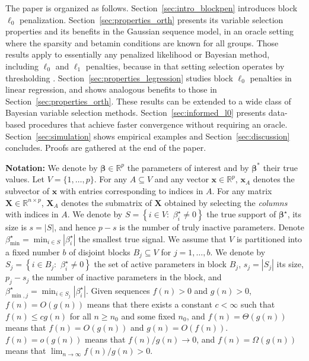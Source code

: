 \documentclass[aos]{imsart}
\theoremstyle{plain}
\newcommand{\R}{\mathbb{R}}
\newcommand{\bs}{\boldsymbol}
\begin{document}
The paper is organized as follows. Section~\ref{sec:intro_blockpen} introduces block $\ell_0$ penalization. Section~\ref{sec:properties_orth} presents its
variable selection properties and its benefits in the Gaussian sequence model, in an oracle setting where the sparsity and betamin conditions are known for all groups.
Those results apply to essentially any penalized likelihood or Bayesian method, including $\ell_0$ and $\ell_1$ penalties, because in that setting selection operates by thresholding \cite{davidomiros,rigollethighdimensional}. Section~\ref{sec:properties_legression} studies block $\ell_0$ penalties in linear regression, and shows analogous benefits to those in Section~\ref{sec:properties_orth}. These results can be extended to a wide class of Bayesian variable selection methods. Section~\ref{sec:informed_l0} presents data-based 
procedures that achieve faster convergence without requiring an oracle. Section~\ref{sec:simulation} shows empirical examples and Section~\ref{sec:discussion} concludes. Proofs are gathered at the end of the paper.
\medskip

\noindent \textbf{Notation:}  
We denote by $\bs \beta\in \R^p$ the parameters of interest and by $\bs \beta^*$ their true values. Let  $V=\{1,\ldots,p\}$. For any $A\subseteq V$ and any vector $\bs x\in \R^p$, $\bs x_A$ denotes the subvector of $\bs x$ with entries corresponding to indices in $A$. For any matrix $\bs X \in \R^{n\times p}$, $\bs X_A$ denotes the submatrix of $\bs X$ obtained by selecting the \emph{columns} with indices in $A$. We denote by
$S=\left\{i\in V:\,\,  \beta^{\star}_i \neq 0 \right\}$ the true support of $\bs \beta^{\star}$, its size is $s=|S|$, and hence $p-s$ is the number of truly inactive parameters.
Denote $\beta_{\min}^{\star}=\min_{i \in S}|\beta^{\star}_i|$ the smallest true signal.
We assume that $V$ is partitioned into a fixed number $b$ of disjoint blocks $B_j \subseteq V$ for $j=1,\ldots,b$.
We denote by $S_j=\left\{i\in B_j:\,\,  \beta^{\star}_i \neq 0\right\}$ the set of active parameters in block $B_j$,  $s_j=|S_j|$ its size, $p_j-s_j$ the number of inactive parameters in the block,
and $\beta_{\min,j}^{\star}=\min_{i \in S_j}|\beta^{\star}_i|$.
Given sequences $f(n) > 0$ and $g(n) >0$, $f(n)=O(g(n))$ means that there exists a constant $c<\infty$ such that $f(n) \leq c g(n)$ for all $n \geq n_0$ and some fixed $n_0$, and $f(n)=\Theta(g(n))$ means that $f(n) = O(g(n))$ and $g(n) = O(f(n))$. 
$f(n)=o(g(n))$ means that $f(n) / g(n) \to 0$, and $f(n)=\Omega(g(n))$ means that $\lim_{n\to\infty}f(n) / g(n) > 0$. 
\medskip
\end{document}
